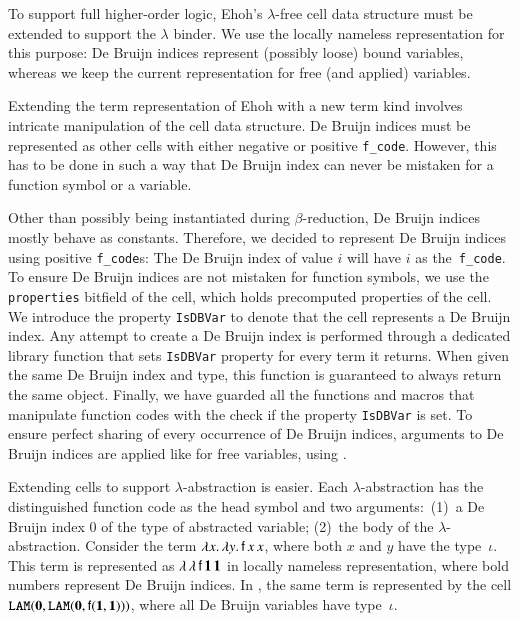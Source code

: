  To support full
higher-order logic, Ehoh's $\lambda$-free cell data structure must
be extended to support the $\lambda$ binder. We use the locally nameless
representation \cite{ac-12-locally-nameless} for this purpose: De Bruijn indices
represent (possibly loose) bound variables, whereas we keep the current
representation for free (and applied) variables.

Extending the term representation of Ehoh with a new term
kind involves intricate manipulation of the cell data structure. De Bruijn
indices must be represented as other cells with either negative or positive
\texttt{f\_code}. However, this has to be done in such a way that De Bruijn
index can never be mistaken for a function symbol or a variable.

Other than possibly being instantiated during $\beta$-reduction, De Bruijn
indices mostly behave as constants. Therefore, we decided to represent De
Bruijn indices using positive \texttt{f\_code}s: The De Bruijn index of value $i$
will have $i$ as the~\verb|f_code|. To ensure De Bruijn indices are not
mistaken for function symbols, we use the \texttt{properties} bitfield of the
cell, which holds precomputed properties of %
the cell. We introduce the
property \texttt{IsDBVar} to denote that the cell represents a De
Bruijn index. Any attempt to create a De Bruijn index is performed through
a dedicated library function that sets \texttt{IsDBVar} property for every term it
returns. When given the same De Bruijn index and type, this function is
guaranteed to always return the same object. Finally, we have guarded all the
functions and macros that manipulate function codes with the check if the
property \texttt{IsDBVar} is set. To ensure perfect sharing of every occurrence
of De Bruijn indices, arguments to De Bruijn indices are applied like for free
variables, using \internalat{}.

Extending cells to support $\lambda$-abstraction is easier. Each
$\lambda$-ab\-strac\-tion has the distinguished function code \internallam{} as the head
symbol and two arguments:\ (1)~a De Bruijn index 0 of the type of abstracted variable;
(2)~the body %
of the $\lambda$-abstraction. Consider
the term $\lambda x. \, \lambda y.\, \mathsf{f}\, x \, x$, where both $x$ and $y$ have
the type~$\iota$. This term is represented as $\lambda\,\lambda\, \mathsf{f} \,
\mathbf{1} \, \mathbf{1}$ in locally nameless representation, where bold numbers
represent De Bruijn indices. In \ehohii{}, the same term is represented by the cell
$\texttt{LAM}(\mathbf{0}, \texttt{LAM}(\mathbf{0}, \mathsf{f}(\mathbf{1}, \mathbf{1})))$,
where all De Bruijn variables have type~$\iota$. 

